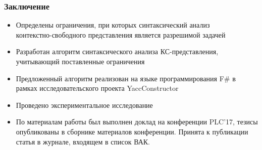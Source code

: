 \documentclass{beamer}
\begin{document}
\begin{frame}
  \transwipe[direction=90]
  \frametitle{Заключение}
	\begin{itemize}
		\item Определены ограничения, при которых синтаксический анализ \\ контекстно-свободного представления является разрешимой задачей
		\item Разработан алгоритм синтаксического анализа КС-представления, учитывающий поставленные ограничения
		\item Предложенный алгоритм реализован на языке программирования F$\#$ в рамках исследовательского проекта YaccConstructor
		\item Проведено экспериментальное исследование
	\end{itemize}
	
	\begin{itemize}
		\item По материалам работы был выполнен доклад на конференции PLC'17, тезисы опубликованы в сборнике материалов конференции. Принята к публикации статья в журнале, входящем в список ВАК.
	\end{itemize}
\end{frame}
\end{document}
